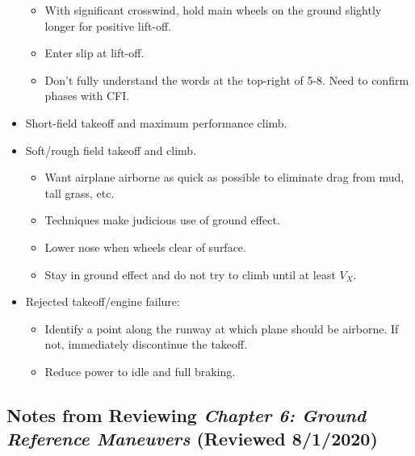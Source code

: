 \documentclass[letterpaper,10pt,titlepage]{article}
\begin{document}
\begin{itemize}
\begin{itemize}
      \item With significant crosswind, hold main wheels on the ground slightly longer
	        for positive lift-off.
      \item Enter slip at lift-off.
      \item Don't fully understand the words at the top-right of 5-8.  Need
	        to confirm phases with CFI.
	  \end{itemize}
\item Short-field takeoff and maximum performance climb.
\item Soft/rough field takeoff and climb.
      \begin{itemize}
      \item Want airplane airborne as quick as possible to eliminate drag from mud, tall
	        grass, etc.
	  \item Techniques make judicious use of ground effect.
      \item Lower nose when wheels clear of surface.
      \item Stay in ground effect and do not try to climb until at least $V_X$.
	  \end{itemize}
\item Rejected takeoff/engine failure:
      \begin{itemize}
      \item Identify a point along the runway at which plane should be airborne.  If not,
	        immediately discontinue the takeoff.
	  \item Reduce power to idle and full braking.
	  \end{itemize}
\end{itemize}


\subsection{Notes from Reviewing \emph{Chapter 6:  Ground Reference Maneuvers}
            (Reviewed 8/1/2020)}
\label{snra0:sgrm0}
\end{document}
